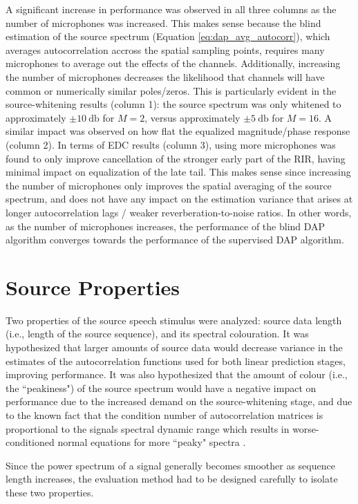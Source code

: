 A significant increase in performance was observed in all three columns as the number of microphones was increased. This makes sense because the blind estimation of the source spectrum (Equation \ref{eq:dap_avg_autocorr}), which averages autocorrelation accross the spatial sampling points, requires many microphones to average out the effects of the channels. Additionally, increasing the number of microphones decreases the likelihood that channels will have common or numerically similar poles/zeros. This is particularly evident in the source-whitening results (column 1): the source spectrum was only whitened to approximately $\pm \qty{10}{\decibel}$ for $M=2$, versus approximately $\pm \qty{5}{\decibel}$ for $M=16$. A similar impact was observed on how flat the equalized magnitude/phase response (column 2). In terms of EDC results (column 3), using more microphones was found to only improve cancellation of the stronger early part of the RIR, having minimal impact on equalization of the late tail. This makes sense since increasing the number of microphones only improves the spatial averaging of the source spectrum, and does not have any impact on the estimation variance that arises at longer autocorrelation lags / weaker reverberation-to-noise ratios. In other words, as the number of microphones increases, the performance of the blind DAP algorithm converges towards the performance of the supervised DAP algorithm.

\section{Source Properties}

Two properties of the source speech stimulus were analyzed: source data length (i.e., length of the source sequence), and its spectral colouration. It was hypothesized that larger amounts of source data would decrease variance in the estimates of the autocorrelation functions used for both linear prediction stages, improving performance. It was also hypothesized that the amount of colour (i.e., the ``peakiness") of the source spectrum would have a negative impact on performance due to the increased demand on the source-whitening stage, and due to the known fact that the condition number of autocorrelation matrices is proportional to the signals spectral dynamic range which results in worse-conditioned normal equations for more ``peaky" spectra \citep{farhang2013adaptive}.

Since the power spectrum of a signal generally becomes smoother as sequence length increases, the evaluation method had to be designed carefully to isolate these two properties.  


